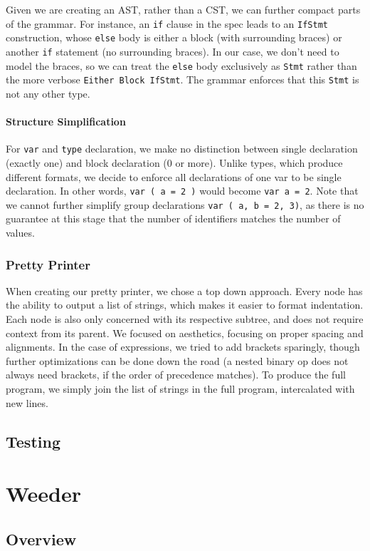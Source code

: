 \documentclass[11pt]{article}
\begin{document}
Given we are creating an AST, rather than a CST, we can further
compact parts of the grammar. For instance, an \texttt{if} clause in the
spec leads to an \texttt{IfStmt} construction, whose \texttt{else} body is either
a block (with surrounding braces) or another \texttt{if} statement (no
surrounding braces). In our case, we don't need to model the braces,
so we can treat the \texttt{else} body exclusively as \texttt{Stmt} rather than
the more verbose \texttt{Either Block IfStmt}. The grammar enforces that
this \texttt{Stmt} is not any other type.
\paragraph{Structure Simplification}
For \texttt{var} and \texttt{type} declaration, we make no distinction between
single declaration (exactly one) and block declaration (0 or
more). Unlike types, which produce different formats, we decide to
enforce all declarations of one var to be single declaration. In
other words, \texttt{var ( a = 2 )} would become \texttt{var a = 2}. Note that
we cannot further simplify group declarations \texttt{var ( a, b = 2,
	3)}, as there is no guarantee at this stage that the number of
identifiers matches the number of values.
\subsubsection{Pretty Printer}
When creating our pretty printer, we chose a top down approach.
Every node has the ability to output a list of strings, which makes
it easier to format indentation. Each node is also only concerned
with its respective subtree, and does not require context from its
parent. We focused on aesthetics, focusing on proper spacing and
alignments. In the case of expressions, we tried to add brackets
sparingly, though further optimizations can be done down the road
(a nested binary op does not always need brackets, if the order of
precedence matches). To produce the full program, we simply join
the list of strings in the full program, intercalated with new lines.

\subsection{Testing}
\section{Weeder}
\subsection{Overview}
\end{document}
